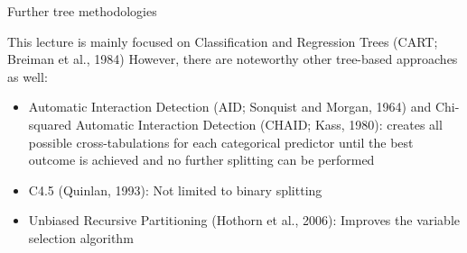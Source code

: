 \documentclass[11pt,compress,t,notes=noshow, xcolor=table]{beamer}
\begin{document}
\begin{vbframe}{Further tree methodologies}

This lecture is mainly focused on Classification and Regression Trees (CART; Breiman et al., 1984)
However, there are noteworthy other tree-based approaches as well:

\begin{itemize}
\item Automatic Interaction Detection (AID; Sonquist and Morgan, 1964) and Chi-squared Automatic Interaction Detection (CHAID; Kass, 1980): creates all possible cross-tabulations for each categorical predictor until the best outcome is achieved and no further splitting can be performed
\item C4.5 (Quinlan, 1993): Not limited to binary splitting
\item Unbiased Recursive Partitioning (Hothorn et al., 2006): Improves the variable selection algorithm
\end{itemize}

\end{vbframe}

\endlecture
\end{document}
